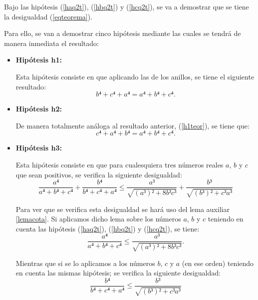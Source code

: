\begin{demostracion}
  Bajo las hipótesis (\ref{haq2t}), (\ref{hbq2t}) y (\ref{hcq2t}), se va a
  demostrar que se tiene la desigualdad (\ref{eqteorema}).

  Para ello, se van a demostrar cinco hipótesis mediante las cuales se
  tendrá de manera inmediata el resultado:
  \begin{itemize}
  \item \textbf{Hipótesis h1:}

    Esta hipótesis consiste en que aplicando las de los anillos, se
    tiene el siguiente resultado:
    \begin{equation}\label{h1teor}\tag{h1}
      b⁴+c⁴+a⁴ = a⁴+b⁴+c⁴.
    \end{equation}

  \item \textbf{Hipótesis h2:}

    De manera totalmente análoga al resultado anterior, (\ref{h1teor}),
    se tiene que:
    \begin{equation}\label{h2teor}\tag{h2}
      c⁴+a⁴+b⁴ = a⁴+b⁴+c⁴.
    \end{equation}

  \item \textbf{Hipótesis h3:}

    Esta hipótesis consiste en que para cualesquiera tres números reales
    \(a\), \(b\) y \(c\) que sean positivos, se verifica la siguiente
    desigualdad:
    \begin{equation}\label{h3teor}\tag{h3}
      \frac{a⁴}{a⁴+b⁴+c⁴}+\frac{b⁴}{b⁴+c⁴+a⁴} ≤
      \frac{a³}{\sqrt{(a³)²+8b³c³}}+\frac{b³}{\sqrt{(b³)²+c³a³}}
    \end{equation}

    Para ver que se verifica esta desigualdad se hará uso del lema
    auxiliar \ref{lemacota}. Si aplicamos dicho lema sobre los números
    \(a\), \(b\) y \(c\) teniendo en cuenta las hipótesis (\ref{haq2t}),
    (\ref{hbq2t}) y (\ref{hcq2t}), se tiene:
    \begin{equation}\label{h3teor1}
      \frac{a⁴}{a⁴+b⁴+c⁴} ≤ \frac{a³}{\sqrt{(a³)²+8b³c³}}.
    \end{equation}

    Mientras que si se lo aplicamos a los números \(b\), \(c\) y \(a\)
    (en ese orden) teniendo en cuenta las mismas hipótesis; se verifica
    la siguiente desigualdad:
    \begin{equation}\label{h3teor2}
      \frac{b⁴}{b⁴+c⁴+a⁴} ≤ \frac{b³}{\sqrt{(b³)²+c³a³}}
    \end{equation}


\end{itemize}
\end{demostracion}

